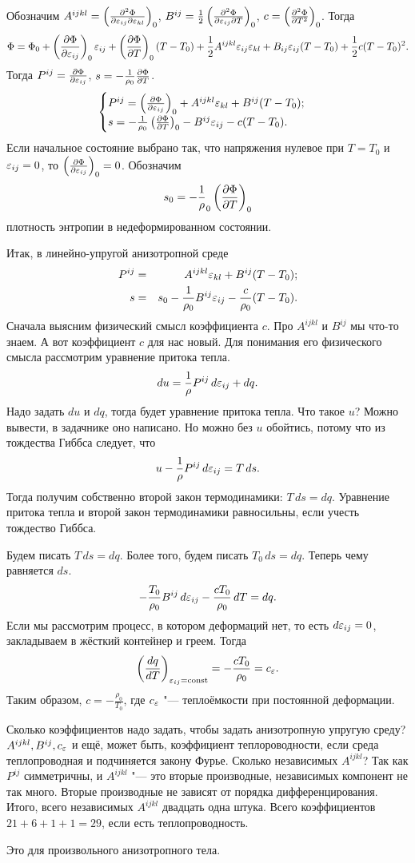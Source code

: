 Обозначим $A^{ijkl} = \left( \frac{\partial ^2\Phi}{\partial \varepsilon_{ij}\partial \varepsilon_{kl}} \right)_0$, $B^{ij} = \frac12\left( \frac{\partial ^2\Phi}{\partial \varepsilon_{ij}\partial T} \right)_0$, $c = \left( \frac{\partial ^2\Phi}{\partial T^2} \right)_0$. Тогда
\[
  \Phi = \Phi_0 + \left( \frac{\partial \Phi}{\partial \varepsilon_{ij}} \right)_0\varepsilon_{ij} + \left( \frac{\partial \Phi}{\partial T} \right)_0(T-T_0) + \frac12 A^{ijkl}\varepsilon_{ij}\varepsilon_{kl} +
  B_{ij}\varepsilon_{ij}(T-T_0) + \frac12 c (T-T_0)^2.
\]
Тогда $P^{ij} = \frac{\partial \Phi}{\partial \varepsilon_{ij}}$, $s = -\frac1{\rho_0}\frac{\partial \Phi}{\partial T}$.
\[
  \begin{cases}
    P^{ij} = \left( \frac{\partial \Phi}{\partial \varepsilon_{ij}} \right)_0 + A^{ijkl}\varepsilon_{kl} + B^{ij}(T-T_0);\\
    s = -\frac1{\rho_0}\left( \frac{\partial \Phi}{\partial T} \right)_0 - B^{ij}\varepsilon_{ij} - c(T-T_0).
\end{cases}
\]
Если начальное состояние выбрано так, что напряжения нулевое при $T=T_0$ и $\varepsilon_{ij}=0$, то $\left( \frac{\partial \Phi}{\partial \varepsilon_{ij}} \right)_0=0$. Обозначим
\[
  s_0 = -\frac1\rho_0\left( \frac{\partial \Phi}{\partial T} \right)_0
\]
плотность энтропии в недеформированном состоянии.

Итак, в линейно-упругой анизотропной среде
\begin{eqnarray*}
  P^{ij} &=&  A^{ijkl} \varepsilon_{kl} + B^{ij}(T-T_0);\\
  s 	 &=&  s_0-\frac1{\rho_0} B^{ij}\varepsilon_{ij} - \frac c{\rho_0} (T-T_0).
\end{eqnarray*}
Сначала выясним физический смысл коэффициента $c$. Про $A^{ijkl}$ и $B^{ij}$ мы что-то знаем. А вот коэффициент $c$ для нас новый. Для понимания его физического смысла рассмотрим уравнение притока тепла.
\[
  du = \frac1{\rho}P^{ij}\,d\varepsilon_{ij} + dq.
\]
Надо задать $du$ и $dq$, тогда будет уравнение притока тепла. Что такое $u$? Можно вывести, в задачнике оно написано. Но можно без $u$ обойтись, потому что из тождества Гиббса следует, что
\[
  u - \frac1\rho P^{ij}\,d{\varepsilon_{ij}} = T\,ds.
\]
Тогда получим собственно второй закон термодинамики: $T\,ds = dq$. Уравнение притока тепла и второй закон термодинамики равносильны, если учесть тождество Гиббса.

Будем писать $T\,ds = dq$. Более того, будем писать $T_0\,ds = dq$. Теперь чему равняется $ds$.
\[
  -\frac{T_0}{\rho_0} B^{ij}\,d\varepsilon_{ij} - \frac{cT_0}{\rho_0}\,dT = dq.
\]
Если мы рассмотрим процесс, в котором деформаций нет, то есть $d\varepsilon_{ij}=0$, закладываем в жёсткий контейнер и греем. Тогда
\[
\left( \frac{dq}{dT} \right)_{\varepsilon_{ij}=\operatorname{const}} = -\frac{cT_0}{\rho_0} = c_\varepsilon.
\]
Таким образом, $c = -\frac{\rho_0}{T_0}$, где $c_\varepsilon$ "--- теплоёмкости при постоянной деформации.


Сколько коэффициентов надо задать, чтобы задать анизотропную упругую среду? $A^{ijkl}, B^{ij}, c_\varepsilon$ и ещё, может быть, коэффициент теплороводности, если среда теплопроводная и подчиняется закону Фурье. Сколько независимых $A^{ijkl}$? Так как $P^{ij}$ симметричны, и $A^{ijkl}$ "--- это вторые производные, независимых компонент не так много. Вторые производные не зависят от порядка дифференцирования. Итого, всего независимых $A^{ijkl}$ двадцать одна штука. Всего коэффициентов $21 + 6 +1 +1 = 29$, если есть теплопроводность.

Это для произвольного анизотропного тела.
